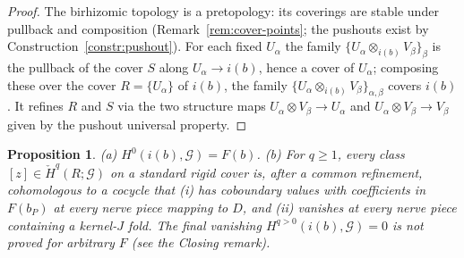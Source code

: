 \documentclass[11pt]{article}
\newtheorem{proposition}[theorem]{Proposition}
\theoremstyle{definition}
\newcommand{\HH}{\check{H}}
\begin{document}
\begin{proof}
The birhizomic topology is a pretopology: its coverings are
stable under pullback and composition
\textup{(}Remark~\ref{rem:cover-points}; the pushouts exist by
Construction~\ref{constr:pushout}\textup{)}. For each fixed
$U_\alpha$ the family $\{U_\alpha\otimes_{i(b)}V_\beta\}_\beta$
is the pullback of the cover $S$ along $U_\alpha\to i(b)$, hence
a cover of $U_\alpha$; composing these over the cover
$R=\{U_\alpha\}$ of $i(b)$, the family
$\{U_\alpha\otimes_{i(b)}V_\beta\}_{\alpha,\beta}$ covers
$i(b)$. It refines $R$ and $S$ via the two structure maps
$U_\alpha\otimes V_\beta\to U_\alpha$ and
$U_\alpha\otimes V_\beta\to V_\beta$ given by the pushout
universal property.
\end{proof}


\begin{proposition}\label{prop:vanish}
\textup{(}a\textup{)} $H^0(i(b),\mathcal G)=F(b)$.
\textup{(}b\textup{)} For $q\ge1$, every class
$[z]\in\HH^{q}(R;\mathcal G)$ on a standard rigid cover is, after a
common refinement, cohomologous to a cocycle that \textup{(}i\textup{)}
has coboundary values with coefficients in $F(b_P)$ at every nerve
piece mapping to $D$, and \textup{(}ii\textup{)} vanishes at every
nerve piece containing a kernel-$J$ fold. The final vanishing
$H^{q>0}(i(b),\mathcal G)=0$ is \emph{not} proved for arbitrary $F$
\textup{(}see the Closing remark\textup{)}.
\end{proposition}
\end{document}
